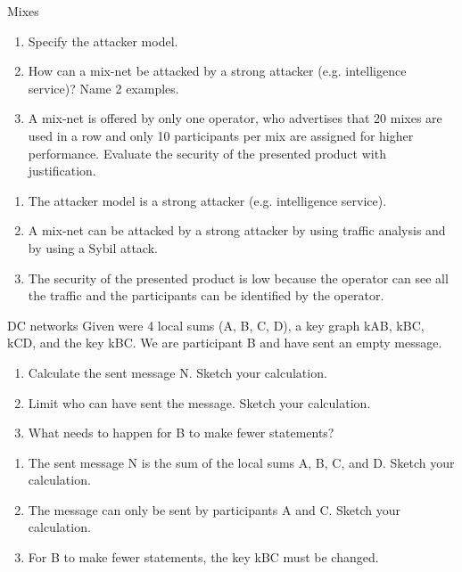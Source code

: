 \documentclass{article}
\begin{document}
\begin{exercise}{Mixes}
  \begin{enumerate}
    \item Specify the attacker model.
    \item How can a mix-net be attacked by a strong attacker (e.g. intelligence service)? Name 2 examples.
    \item A mix-net is offered by only one operator, who advertises that 20 mixes are used in a row and only 10 participants per mix are assigned for higher performance. Evaluate the security of the presented product with justification.
  \end{enumerate}

  \begin{solution}
    \begin{enumerate}
      \item The attacker model is a strong attacker (e.g. intelligence service).
      \item A mix-net can be attacked by a strong attacker by using traffic analysis and by using a Sybil attack.
      \item The security of the presented product is low because the operator can see all the traffic and the participants can be identified by the operator.
    \end{enumerate}
  \end{solution}
\end{exercise}

\begin{exercise}{DC networks}
  Given were 4 local sums (A, B, C, D), a key graph kAB, kBC, kCD, and the key kBC. We are participant B and have sent an empty message.
  \begin{enumerate}
    \item Calculate the sent message N. Sketch your calculation.
    \item Limit who can have sent the message. Sketch your calculation.
    \item What needs to happen for B to make fewer statements?
  \end{enumerate}

  \begin{solution}
    \begin{enumerate}
      \item The sent message N is the sum of the local sums A, B, C, and D. Sketch your calculation.
      \item The message can only be sent by participants A and C. Sketch your calculation.
      \item For B to make fewer statements, the key kBC must be changed.
    \end{enumerate}
  \end{solution}
\end{exercise}
\end{document}
